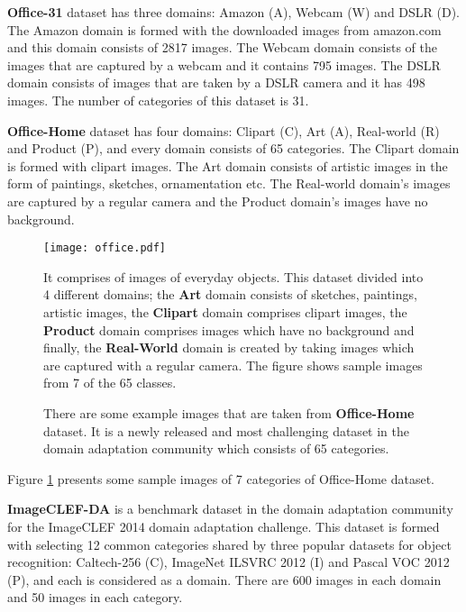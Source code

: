 \documentclass[review]{elsarticle}
\begin{document}
\textbf{Office-31} \cite{Saenko:2010:AVC:1888089.1888106} dataset has three domains: Amazon (A), Webcam (W) and DSLR (D). The Amazon domain is formed with the downloaded images from amazon.com and this domain consists of 2817 images. The Webcam domain consists of the images that are captured by a webcam and it contains 795 images. The DSLR domain consists of images that are taken by a DSLR camera and it has 498 images. The number of categories of this dataset is 31. 

\textbf{Office-Home} \cite{venkateswara2017Deep} dataset has four domains: Clipart (C), Art (A), Real-world (R) and Product (P), and every domain consists of 65 categories. The Clipart domain is formed with clipart images. The Art domain consists of artistic images in the form of paintings, sketches, ornamentation etc. The Real-world domain's images are captured by a regular camera and the Product domain's images have no background. 

\begin{figure}
\begin{center}
\texttt{[image: office.pdf]}
\end{center}
   \caption{There are some example images that are taken from \textbf{Office-Home} dataset. It is a newly released and most challenging dataset in the domain adaptation community which consists of 65 categories.} It comprises of images of everyday objects. This dataset divided into 4 different domains; the \textbf{Art} domain consists of sketches, paintings, artistic images, the \textbf{Clipart} domain comprises clipart images, the \textbf{Product} domain comprises images which have no background and finally, the \textbf{Real-World} domain is created by taking images which are captured with a regular camera. The figure shows sample images from 7 of the 65 classes.
\label{fig:office}
\end{figure}

Figure \ref{fig:office} presents some sample images of 7 categories of Office-Home dataset.  












\textbf{ImageCLEF-DA} is a benchmark dataset in the domain adaptation community for the ImageCLEF 2014 domain adaptation challenge. This dataset is formed with selecting 12 common categories shared by three popular datasets for object recognition: Caltech-256 (C), ImageNet ILSVRC 2012 (I) and Pascal
VOC 2012 (P), and each is considered as a domain. There are 600 images in each domain and 50 images in each category.
\end{document}

